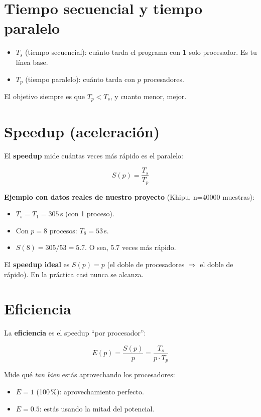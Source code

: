 \documentclass[11pt,a4paper]{article}
\newcommand{\term}[1]{\textbf{\textcolor{clave}{#1}}}
\begin{document}
\section{Tiempo secuencial y tiempo paralelo}

\begin{itemize}
  \item \term{$T_s$} (tiempo secuencial): cuánto tarda el programa con
        \textbf{1} solo procesador. Es tu línea base.
  \item \term{$T_p$} (tiempo paralelo): cuánto tarda con \textbf{$p$}
        procesadores.
\end{itemize}

El objetivo siempre es que $T_p < T_s$, y cuanto menor, mejor.

\section{Speedup (aceleración)}

El \term{speedup} mide cuántas veces más rápido es el paralelo:

\[
S(p)=\frac{T_s}{T_p}
\]

\textbf{Ejemplo con datos reales de nuestro proyecto} (Khipu, n=40000 muestras):
\begin{itemize}
  \item $T_s = T_1 = 305$\,s (con 1 proceso).
  \item Con $p=8$ procesos: $T_8 = 53$\,s.
  \item $S(8)=305/53 = 5.7$. O sea, 5.7 veces más rápido.
\end{itemize}

El \term{speedup ideal} es $S(p)=p$ (el doble de procesadores $\Rightarrow$ el
doble de rápido). En la práctica casi nunca se alcanza.

\section{Eficiencia}

La \term{eficiencia} es el speedup ``por procesador'':

\[
E(p)=\frac{S(p)}{p}=\frac{T_s}{p\cdot T_p}
\]

Mide qué \emph{tan bien} estás aprovechando los procesadores:
\begin{itemize}
  \item $E=1$ (100\,\%): aprovechamiento perfecto.
  \item $E=0.5$: estás usando la mitad del potencial.
\end{itemize}
\end{document}
